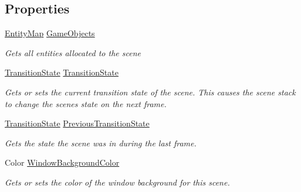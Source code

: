 \subsection*{Properties}
\begin{DoxyCompactItemize}
\item 
\hyperlink{class_midnight_blue_1_1_engine_1_1_entity_component_1_1_entity_map}{Entity\+Map} \hyperlink{class_midnight_blue_1_1_engine_1_1_scenes_1_1_scene_adbcdbbf88e88d55d673cd5be8c79555c}{Game\+Objects}
\begin{DoxyCompactList}\small\item\em Gets all entities allocated to the scene \end{DoxyCompactList}\item 
\hyperlink{namespace_midnight_blue_1_1_engine_1_1_scenes_a829c47ebe553886b3b3e92db386e2557}{Transition\+State} \hyperlink{class_midnight_blue_1_1_engine_1_1_scenes_1_1_scene_a6c674383c2a71025e9ab2f6c5e0d1139}{Transition\+State}
\begin{DoxyCompactList}\small\item\em Gets or sets the current transition state of the scene. This causes the scene stack to change the scenes state on the next frame. \end{DoxyCompactList}\item 
\hyperlink{namespace_midnight_blue_1_1_engine_1_1_scenes_a829c47ebe553886b3b3e92db386e2557}{Transition\+State} \hyperlink{class_midnight_blue_1_1_engine_1_1_scenes_1_1_scene_a13fa8b0788c8b7499a79b9f6374465c8}{Previous\+Transition\+State}
\begin{DoxyCompactList}\small\item\em Gets the state the scene was in during the last frame. \end{DoxyCompactList}\item 
Color \hyperlink{class_midnight_blue_1_1_engine_1_1_scenes_1_1_scene_abbf66efd894bdd76cc0f0f924591c62f}{Window\+Background\+Color}
\begin{DoxyCompactList}\small\item\em Gets or sets the color of the window background for this scene. \end{DoxyCompactList}\item 

\end{DoxyCompactItemize}
